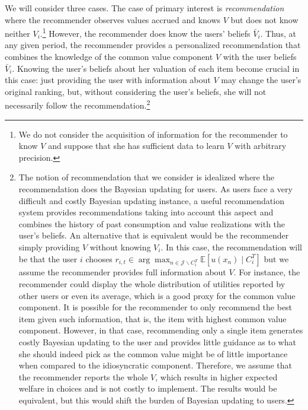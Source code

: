 \documentclass[format=acmsmall, review=false]{acmart}
\begin{document}
We will consider three cases. The case of primary interest is \textit{recommendation} where the recommender observes values accrued and knows $V$ but does not know neither $V_i$.\footnote{We do not consider the acquisition of information for the recommender to know $V$ and suppose that she has sufficient data to learn $V$ with arbitrary precision.} However, the recommender does know the users' beliefs $\bar V_i$. Thus, at any given period, the recommender provides a personalized recommendation that combines the knowledge of the common value component $V$ with the user beliefs $\bar V_i$. Knowing the user's beliefs about her valuation of each item become crucial in this case: just providing the user with information about $V$ may change the user's original ranking, but, without considering the user's beliefs, she will not necessarily follow the recommendation.\footnote{The notion of recommendation that we consider is idealized where the recommendation does the Bayesian updating for users. As users face a very difficult and costly Bayesian updating instance, a useful recommendation system provides recommendations taking into account this aspect and combines the history of past consumption and value realizations with the user's beliefs. 
An alternative that is equivalent would be the recommender simply providing $V$ without knowing $V_i$. In this case, the recommendation will be that the user $i$ chooses $r_{i,t} \in \arg \max_{n\in \mathcal J\backslash C^T_i} \mathbb E[u(x_n) \mid C_i^T]$
but we assume the recommender provides full information about $V$. For instance, the recommender could display the whole distribution of utilities reported by other users or even its average, which is a good proxy for the common value component. It is possible for the recommender to only recommend the best item given such information, that is, the item with highest common value component. However, in that case, recommending only a single item generates costly Bayesian updating to the user and provides little guidance as to what she should indeed pick as the common value might be of little importance when compared to the idiosyncratic component. Therefore, we assume that the recommender reports the whole $V$, which results in higher expected welfare in choices and is not costly to implement.
The results would be equivalent, but this would shift the burden of Bayesian updating to users.}
\par
\end{document}
